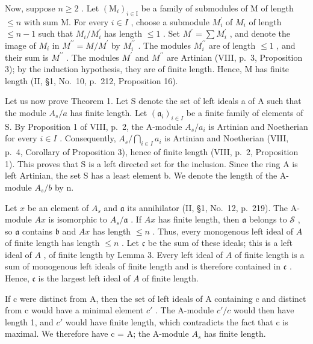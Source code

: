 Now, suppose \(n \geqslant 2\) . Let \((\mathrm{M}_{i})_{i \in \mathrm{I}}\) be a family of submodules of M of length \(\leqslant n\) with sum M. For every \(i \in I\) , choose a submodule \(M_{i}^{\prime}\) of \(M_{i}\) of length \(\leqslant n - 1\) such that \(M_{i}/M_{i}^{\prime}\) has length \(\leqslant 1\) . Set \(M^{\prime} = \sum M_{i}^{\prime}\) , and denote the image of \(M_{i}\) in \(M^{\prime\prime} = M/M^{\prime}\) by \(M_{i}^{\prime\prime}\) . The modules \(M_{i}^{\prime\prime}\) are of length \(\leqslant 1\) , and their sum is \(M^{\prime\prime}\) . The modules \(M^{\prime}\) and \(M^{\prime\prime}\) are Artinian (VIII, p.~3, Proposition 3); by the induction hypothesis, they are of finite length. Hence, M has finite length (II, §1, No.~10, p.~212, Proposition 16).

Let us now prove Theorem 1. Let S denote the set of left ideals a of A such that the module \(A_{s}/a\) has finite length. Let \((\mathfrak{a}_{i})_{i\in I}\) be a finite family of elements of S. By Proposition 1 of VIII, p.~2, the A-module \(A_{s}/a_{i}\) is Artinian and Noetherian for every \(i\in I\) . Consequently, \(A_{s}/\bigcap_{i\in I}a_{i}\) is Artinian and Noetherian (VIII, p.~4, Corollary of Proposition 3), hence of finite length (VIII, p.~2, Proposition 1). This proves that S is a left directed set for the inclusion. Since the ring A is left Artinian, the set S has a least element b. We denote the length of the A-module \(A_{s}/b\) by n.

Let \(x\) be an element of \(A_s\) and \(\mathfrak{a}\) its annihilator (II, §1, No.~12, p.~219). The A-module \(Ax\) is isomorphic to \(A_s / \mathfrak{a}\) . If \(Ax\) has finite length, then \(\mathfrak{a}\) belongs to \(\mathscr{S}\) , so \(\mathfrak{a}\) contains \(\mathfrak{b}\) and \(Ax\) has length \(\leqslant n\) . Thus, every monogenous left ideal of \(A\) of finite length has length \(\leqslant n\) . Let \(\mathfrak{c}\) be the sum of these ideals; this is a left ideal of \(A\) , of finite length by Lemma 3. Every left ideal of \(A\) of finite length is a sum of monogenous left ideals of finite length and is therefore contained in \(\mathfrak{c}\) . Hence, \(\mathfrak{c}\) is the largest left ideal of \(A\) of finite length.

If c were distinct from A, then the set of left ideals of A containing c and distinct from c would have a minimal element \(c'\) . The A-module \(c'/c\) would then have length 1, and \(c'\) would have finite length, which contradicts the fact that c is maximal. We therefore have c = A; the A-module \(A_{s}\) has finite length.

